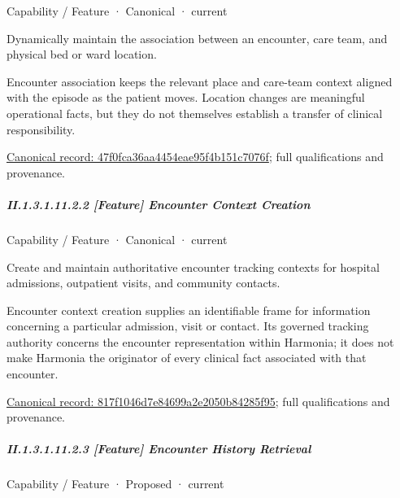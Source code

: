 \label{element:47f0fca36aa4454eae95f4b151c7076f}
{\small Capability / Feature · Canonical · current}\par

Dynamically maintain the association between an encounter, care team, and physical bed or ward location.



Encounter association keeps the relevant place and care-team context aligned with the episode as the patient moves. Location changes are meaningful operational facts, but they do not themselves establish a transfer of clinical responsibility.


{\footnotesize \href{../../../../../../../continuum/strategy/capability/feature/47f0fca36aa4454eae95f4b151c7076f.md}{Canonical record: 47f0fca36aa4454eae95f4b151c7076f}; full qualifications and provenance.}\par
\subparagraph*{II.1.3.1.11.2.2 [Feature] Encounter Context Creation}
\label{navigation:II.1.3.1.11.2.2}

\label{element:817f1046d7e84699a2e2050b84285f95}
{\small Capability / Feature · Canonical · current}\par

Create and maintain authoritative encounter tracking contexts for hospital admissions, outpatient visits, and community contacts.



Encounter context creation supplies an identifiable frame for information concerning a particular admission, visit or contact. Its governed tracking authority concerns the encounter representation within Harmonia; it does not make Harmonia the originator of every clinical fact associated with that encounter.


{\footnotesize \href{../../../../../../../continuum/strategy/capability/feature/817f1046d7e84699a2e2050b84285f95.md}{Canonical record: 817f1046d7e84699a2e2050b84285f95}; full qualifications and provenance.}\par
\subparagraph*{II.1.3.1.11.2.3 [Feature] Encounter History Retrieval}
\label{navigation:II.1.3.1.11.2.3}

\label{element:4088e1408f554143a0f1469efd1b43a7}
{\small Capability / Feature · Proposed · current}\par

